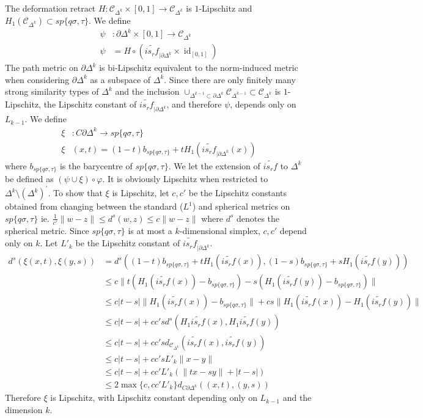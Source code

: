 \documentclass[a4paper,11pt]{article}
\theoremstyle{definition}
\theoremstyle{plain}
\theoremstyle{remark}
\DeclareMathOperator{\id}{id}
\begin{document}
{The deformation retract $H:\mathscr{C}_{\Delta^{k}} \times [0,1]\rightarrow \mathscr{C}_{\Delta^{k}}$ is $1$-Lipschitz and $H_{1}(\mathscr{C}_{\Delta^{k}})\subset sp\{q\sigma,\tau\}$. We define
\begin{align*}
\psi &:  \partial{\Delta^k} \times [0,1] \rightarrow \mathscr{C}_{\Delta^{k}} \\
\psi &= H\circ (\widetilde{is_{r}f}_{|\partial \Delta^{k}} \times \id_{[0,1]})
\end{align*}
The path metric on $\partial \Delta^{k}$ is bi-Lipschitz equivalent to the norm-induced metric when considering $\partial \Delta^{k}$ as a subspace of $\Delta^{k}$. Since there are only finitely many strong similarity types of $\Delta^{k}$ and the inclusion $\cup_{\Delta^{k-1}\subset \partial \Delta^{k}}\mathscr{C}_{\Delta^{k-1}}\subset \mathscr{C}_{\Delta^{k}}$ is $1$-Lipschitz, the Lipschitz constant of $\widetilde{is_{r}f}_{|\partial \Delta^{k}}$, and therefore $\psi$, depends only on $L_{k-1}$. We define 
\begin{align*}
\xi &: C\partial \Delta^{k} \rightarrow sp\{q\sigma,\tau\}\\
\xi &(x,t) = (1-t)b_{sp\{q\sigma,\tau\}} + tH_{1}(\widetilde{is_{r}f}_{|\partial \Delta^{k}}(x)) 
\end{align*}
where $b_{sp\{q\sigma,\tau\}}$ is the barycentre of $sp\{q\sigma,\tau\}$. We let the extension of $\widetilde{is_{r}f}$ to $\Delta^{k}$ be defined as $(\psi\cup \xi)\circ \varphi$. It is obviously Lipschitz when restricted to $\Delta^k\setminus  (\Delta^{k})^{'}$. To show that $\xi$ is Lipschitz, let $c,c'$ be the Lipschitz constants obtained from changing between the standard ($L^1$) and spherical metrics on $sp\{q\sigma,\tau\}$ ie. $\frac{1}{c'} \|w-z\| \leq d^s(w,z)\leq c \|w-z\| $ where $d^{s}$ denotes the spherical metric. Since $sp\{q\sigma,\tau\}$ is at most a $k$-dimensional simplex, $c,c'$ depend only on $k$. Let $L'_{k}$ be the Lipschitz constant of $\widetilde{is_{r}f}_{|\partial \Delta^{k}}$.
\begin{align*}
d^{s}(\xi(x,t),\xi (y,s))&=d^{s}((1-t)b_{sp\{q\sigma,\tau\}} + tH_{1}(\widetilde{is_{r}f}(x)), (1-s)b_{sp\{q\sigma,\tau\}} + sH_{1}(\widetilde{is_{r}f}(y)))\\
& \leq  c \| t(H_{1}(\widetilde{is_{r}f}(x))-b_{sp\{q\sigma,\tau\}}) -s(H_{1}(\widetilde{is_{r}f}(y))-b_{sp\{q\sigma,\tau\}})\| \\
& \leq c |t-s|\|H_{1}(\widetilde{is_{r}f}(x)) -b_{sp\{q\sigma,\tau\}}\| + cs\|H_{1}(\widetilde{is_{r}f}(x)) -H_{1}(\widetilde{is_{r}f}(y))\| \\
&\leq c |t-s| +cc' s d^{s}(H_{1}\widetilde{is_{r}f}(x),H_{1}\widetilde{is_{r}f}(y)) \\
& \leq c |t-s| +cc' sd_{\mathscr{C}_{\Delta^{k}}}(\widetilde{is_{r}f}(x),\widetilde{is_{r}f}(y)) \\
&\leq c |t-s| +cc's L'_k\|x-y\|\\
& \leq c |t-s| +cc'L'_k(\|tx-sy\| + |t-s|)\\
& \leq 2\max\{c,cc'L'_k\} d_{C\partial\Delta^{k}}((x,t),(y,s))
\end{align*}
Therefore $\xi$ is Lipschitz, with Lipschitz constant depending only on $L_{k-1}$ and the dimension $k$.\\

}
\end{document}
